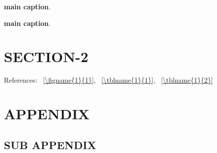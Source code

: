\documentclass[12pt, lettersize]{article}
\begin{document}
\begin{table}[H]
  \centering
  \small
  
  \caption[main caption]
  {
      \textbf{main caption}.
      \blindtext
  }
  \label{\tblname{1}{1}}
\end{table}

\begin{table}[H]
  \centering
  \small
  
  \caption[main caption]
  {
      \textbf{main caption}.
      \blindtext
  }
  \label{\tblname{1}{2}}
\end{table}

\section{SECTION-2}
\lipsum[1]
\cite{smit54,colu92,gree00,phil99,jame76}

\noindent{}References:
\FIGURE~\ref{\figname{1}{1}},
\TABLE~\ref{\tblname{1}{1}},
\TABLE~\ref{\tblname{1}{2}}

\newpage
\printbibliography


\newpage
\appendix
\section{APPENDIX}
\lipsum[1]

\subsection{SUB APPENDIX}
\lipsum[1-2]

\end{document}
